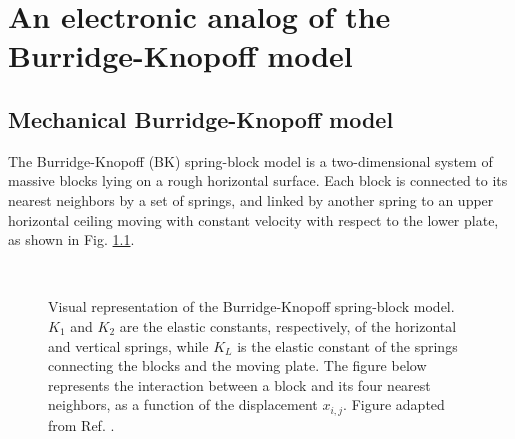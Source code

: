 \chapter{An electronic analog of the Burridge-Knopoff model}
\label{chap: electronic analog of bk}

\section{Mechanical Burridge-Knopoff model}
\label{sec: mechanical bk}

The Burridge-Knopoff (BK) spring-block model \cite{ref:bk} is a two-dimensional system of massive blocks
lying on a rough horizontal surface. Each block is connected to its nearest neighbors by a set of springs,
and linked by another spring to an upper horizontal ceiling moving with constant velocity with respect to the lower plate,
as shown in Fig. \ref{fig bk}.

\begin{figure}[H]
    \centering
    \\[0.43cm]
    \caption{Visual representation of the Burridge-Knopoff spring-block model. $K_1$ and $K_2$
    are the elastic constants, respectively, of the horizontal and vertical springs, while $K_L$
    is the elastic constant of the springs connecting the blocks and the moving plate.
    The figure below represents the interaction between a block and its four nearest neighbors,
    as a function of the displacement $x_{i,j}$. Figure adapted from Ref. \cite{ref:ofc}.}
    \label{fig bk}
\end{figure}

